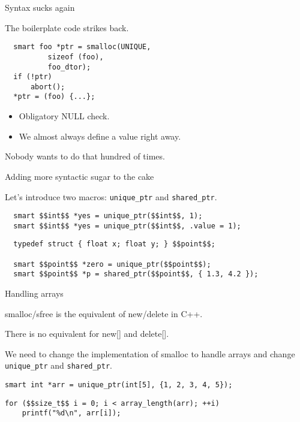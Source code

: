\documentclass[10pt]{beamer}
\begin{document}
\begin{frame}[fragile]{Syntax sucks again}

  The boilerplate code strikes back.

  \begin{lstlisting}
  smart foo *ptr = smalloc(UNIQUE,
          sizeof (foo),
          foo_dtor);
  if (!ptr)
      abort();
  *ptr = (foo) {...};
  \end{lstlisting}

  \pause{}

  \begin{itemize}
    \item Obligatory NULL check.
    \item We almost always define a value right away.
  \end{itemize}

  Nobody wants to do that hundred of times.

\end{frame}

\begin{frame}[fragile]{Adding more syntactic sugar to the cake}

  Let's introduce two macros: \verb|unique_ptr| and \verb|shared_ptr|.

  \begin{lstlisting}
  smart $$int$$ *yes = unique_ptr($$int$$, 1);
  smart $$int$$ *yes = unique_ptr($$int$$, .value = 1);
  \end{lstlisting}

  \begin{lstlisting}
  typedef struct { float x; float y; } $$point$$;

  smart $$point$$ *zero = unique_ptr($$point$$);
  smart $$point$$ *p = shared_ptr($$point$$, { 1.3, 4.2 });
  \end{lstlisting}

\end{frame}

\begin{frame}[fragile]{Handling arrays}

  smalloc/sfree is the equivalent of new/delete in C++.

  There is no equivalent for new[] and delete[].

  We need to change the implementation of smalloc to handle arrays and change
  \verb|unique_ptr| and \verb|shared_ptr|.

  \pause{}

  \begin{lstlisting}
smart int *arr = unique_ptr(int[5], {1, 2, 3, 4, 5});
  \end{lstlisting}

  \pause{}

  \begin{lstlisting}
for ($$size_t$$ i = 0; i < array_length(arr); ++i)
    printf("%d\n", arr[i]);
  \end{lstlisting}

\end{frame}
\end{document}
